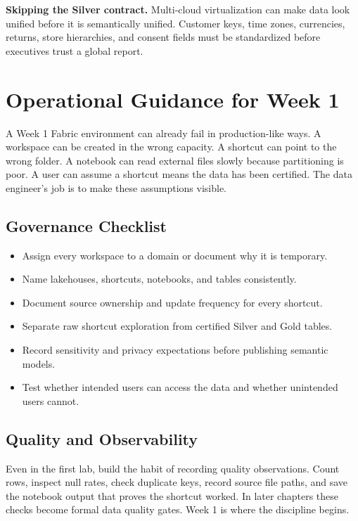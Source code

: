 \begin{pitfall}
\textbf{Skipping the Silver contract.} Multi-cloud virtualization can make data look unified before it is semantically unified. Customer keys, time zones, currencies, returns, store hierarchies, and consent fields must be standardized before executives trust a global report.
\end{pitfall}

\section{Operational Guidance for Week 1}
A Week 1 Fabric environment can already fail in production-like ways. A workspace can be created in the wrong capacity. A shortcut can point to the wrong folder. A notebook can read external files slowly because partitioning is poor. A user can assume a shortcut means the data has been certified. The data engineer's job is to make these assumptions visible.

\subsection{Governance Checklist}
\begin{itemize}
    \item Assign every workspace to a domain or document why it is temporary.
    \item Name lakehouses, shortcuts, notebooks, and tables consistently.
    \item Document source ownership and update frequency for every shortcut.
    \item Separate raw shortcut exploration from certified Silver and Gold tables.
    \item Record sensitivity and privacy expectations before publishing semantic models.
    \item Test whether intended users can access the data and whether unintended users cannot.
\end{itemize}

\subsection{Quality and Observability}
Even in the first lab, build the habit of recording quality observations. Count rows, inspect null rates, check duplicate keys, record source file paths, and save the notebook output that proves the shortcut worked. In later chapters these checks become formal data quality gates. Week 1 is where the discipline begins.

